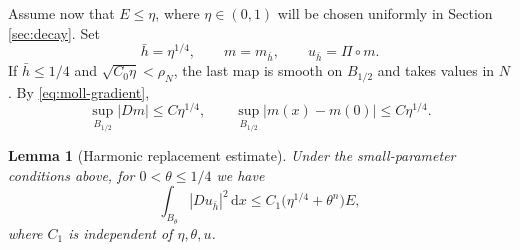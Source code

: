 \documentclass[11pt,a4paper]{article}
\numberwithin{equation}{section}
\newtheorem{lemma}[theorem]{Lemma}
\theoremstyle{definition}
\newcommand{\dd}{\,\mathrm d}
\newcommand{\dx}{\dd x}
\begin{document}
Assume now that $E\le\eta$, where $\eta\in(0,1)$ will be chosen uniformly in Section \ref{sec:decay}. Set
\begin{equation}\label{eq:fixed-scale}
\bar h=\eta^{1/4},\qquad m=m_{\bar h},\qquad u_{\bar h}=\Pi\circ m.
\end{equation}
If $\bar h\le1/4$ and $\sqrt{C_0\eta}<\rho_N$, the last map is smooth on $B_{1/2}$ and takes values in $N$. By \eqref{eq:moll-gradient},
\begin{equation}\label{eq:oscillation}
\sup_{B_{1/2}}|Dm|\le C\eta^{1/4},
\qquad \sup_{B_{1/2}}|m(x)-m(0)|\le C\eta^{1/4}.
\end{equation}

\begin{lemma}[Harmonic replacement estimate]\label{lem:harmonic}
Under the small-parameter conditions above, for $0<\theta\le1/4$ we have
\begin{equation}\label{eq:projected-energy}
\int_{B_\theta}|Du_{\bar h}|^2\dx
\le C_1\bigl(\eta^{1/4}+\theta^n\bigr)E,
\end{equation}
where $C_1$ is independent of $\eta,\theta,u$.
\end{lemma}
\end{document}
